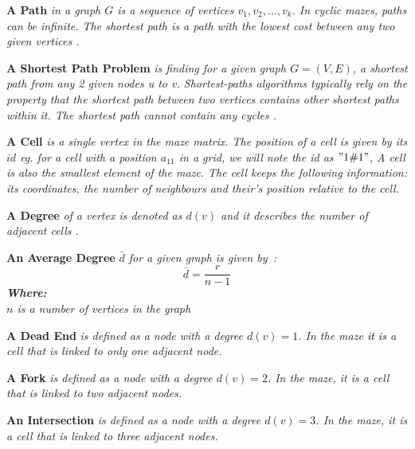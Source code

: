 \begin{definition}\textbf{A Path } \emph{in a graph $G$ is a sequence of vertices $v_1, v_2,\ldots,v_k$. In cyclic mazes, paths can be infinite. The shortest path is a path with the lowest cost between any two given vertices \cite{9}.}\end{definition}
\begin{definition}\textbf{A Shortest Path Problem } \emph{is finding for a given graph $G = (V,E)$, a shortest path from any 2 given nodes \textit{u} to \textit{v}. Shortest-paths algorithms typically rely on the property that the shortest path between two vertices contains other shortest paths within it.
The shortest path cannot contain any cycles \cite{5}.}\end{definition}
\begin{definition}\textbf{A Cell} \emph{is a single vertex in the maze matrix. The position of a cell is given by its $id$ eg. for a cell with a position $a_{11}$ in a grid, we will note the id as $"1\char"0023 1"$, A cell is also the smallest element of the maze. The cell keeps the following information: its coordinates, the number of neighbours and their’s position relative to the cell.}\end{definition}
\begin{definition}\textbf{A Degree } \emph{of a vertex is denoted as $d(v)$ and it describes the number of adjacent cells \cite{10}.}\end{definition}
\begin{definition}\textbf{An Average Degree }\emph{ $\bar{d}$ for a given graph is given by~\cite{10}:\\
\begin{equation}
\bar{d} = \frac{r}{n-1}	
\end{equation}
\textbf{Where:}\\
$n$ is a number of vertices in the graph\\	
}\end{definition}
\begin{definition}\textbf{A Dead End} \emph{ is defined as a node with a degree $d(v) = 1$. In the maze \textcolor{black}{it is} a cell that is linked to only one adjacent node.}\end{definition}
\begin{definition}\textbf{A Fork} \emph{is defined as a node with a degree $d(v) = 2$. In the maze, it is a cell that is linked to two adjacent nodes.}\end{definition}
\begin{definition}\textbf{An Intersection} \emph{ is defined as a node with a degree $d(v) = 3$. In the maze, it is a cell that is linked to three adjacent nodes.}\end{definition}
